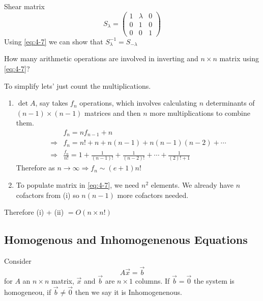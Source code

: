 \documentclass{article}
\numberwithin{equation}{section}
\begin{document}
\begin{eg}
    Shear matrix 
    \[
        S_\lambda = \begin{pmatrix}
            1 & \lambda & 0 \\
            0 & 1 & 0 \\
            0 & 0 & 1
        \end{pmatrix}  
    \]
    Using \eqref{eq:4-7} we can show that $S_\lambda^{-1} = S_{-\lambda}$
\end{eg}

\begin{remark}
    How many arithmetic operations are involved in inverting and $n \times n$ matrix using \eqref{eq:4-7}?

    To simplify lets' just count the multiplications.
    \begin{enumerate}
        \item $\det A$, say takes $f_n$ operations, which involves calculating $n$ determinants of $(n-1) \times (n-1)$ matrices and then $n$ more multiplications to combine them.
        \begin{align*}
            &f_n = n f_{n-1} + n \\
            \Rightarrow& f_n = n! + n + n(n-1) + n(n-1)(n-2) + \cdots \\
            \Rightarrow& \frac{f_n}{n!} = 1 + \frac{1}{(n-1)!} + \frac{1}{(n-2)!} + \cdots + \frac{1}{(2)! + 1}
        \end{align*}
        Therefore as $n \rightarrow \infty \Rightarrow f_n \sim (e+ 1)n!$

        \item To populate matrix in \eqref{eq:4-7}, we need $n^2$ elements. We already have $n$ cofactors from (i) so $n(n-1)$ more cofactors needed.
    \end{enumerate}
    Therefore (i) + (ii) $= O(n \times n!)$
\end{remark}

\subsection{Homogenous and Inhomogenenous Equations}
Consider
\begin{equation}\label{eq:4-8}
    A \vec x = \vec b
\end{equation}
for $A$ an $n \times n$ matrix, $\vec x$ and $\vec b$ are $n \times 1$ columns.
If $\vec b = \vec 0$ the system is homogeneou, if $\vec b \neq \vec 0$ then we say it is Inhomogenenous.
\end{document}
